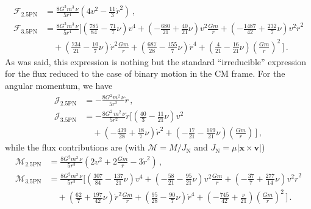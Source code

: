 \documentclass[prd,preprint,superscriptaddress,tightenlines,nofootinbib,
  eqsecnum,showpacs]{revtex4}
\begin{document}
%
\begin{subequations}\label{Fdiss}
\begin{align}
\mathcal{F}_\text{2.5PN} &= \frac{8 G^3 m^3\,\nu}{5r^4}\left( 4 v^2 -
\frac{11}{3}\dot{r}^2\right)\,,\\
\mathcal{F}_\text{3.5PN} &= \frac{8 G^3 m^3\,\nu}{5r^4}
\biggl[ \left(\frac{785}{84}-\frac{71}{7}\nu\right)v^4 
+ \left(-\frac{680}{21}+\frac{40}{21}\nu\right)v^2\frac{G m}{r} 
+ \left(-\frac{1487}{42}+\frac{232}{7}\nu\right)v^2\dot{r}^2 \nonumber\\
                         &\quad 
+ \left(\frac{734}{21}-\frac{10}{7}\nu\right)\dot{r}^2\frac{G m}{r} 
+ \left(\frac{687}{28}-\frac{155}{7}\nu\right)\dot{r}^4 
+ \left(\frac{4}{21}-\frac{16}{21}\nu\right)
\left(\frac{G m}{r}\right)^2 \,\biggr]\,.
\end{align}\end{subequations}
%
As was said, this expression is nothing but the standard ``irreducible'' expression
for the flux reduced to the case of binary motion in the CM frame. For the
angular momentum, we have
%
\begin{subequations}\label{Jdiss}
\begin{align}
\mathcal{J}_\text{2.5PN} &= - \frac{8 G^2 m^2\,\nu}{5r^2}\dot{r}\,,\\
\mathcal{J}_\text{3.5PN} &= 
- \frac{8 G^2 \,m^2\,\nu}{5r^2}\dot{r}
\biggl[ \left(\frac{40}{3}-\frac{11}{21}\nu\right)v^2 
\nonumber\\ &\quad + \left(-\frac{439}{28}
+\frac{18}{7}\nu\right) \dot{r}^2
+ \left(-\frac{17}{21}-\frac{169}{21}\nu\right) 
\left(\frac{G m}{r}\right)\,\biggr]\,,
\end{align}\end{subequations}
%
while the flux contributions are (with $\mathcal{M}=M/J_\text{N}$ and $J_\text{N}=\mu\vert\bm{x}\times\bm{v}\vert$)
%
\begin{subequations}\label{Gdiss}
\begin{align}
\mathcal{M}_\text{2.5PN} &= \frac{8 G^2 m^2\,\nu}{5r^3}\left( 2 v^2 
+ 2\frac{G m}{r} - 3\dot{r}^2\right)\,,\\
\mathcal{M}_\text{3.5PN} &= \frac{8 G^2 m^2\,\nu}{5r^3}
\biggl[ \left(\frac{307}{84}-\frac{137}{21}\nu\right)v^4 
+ \left(-\frac{58}{21}-\frac{95}{21}\nu\right)v^2\frac{G m}{r} 
+ \left(-\frac{37}{7}+\frac{277}{14}\nu\right)v^2\dot{r}^2 \nonumber\\ 
&\quad + \left(\frac{62}{7}+\frac{197}{42}\nu\right)\dot{r}^2\frac{G m}{r} 
+ \left(\frac{95}{28}-\frac{90}{7}\nu\right)\dot{r}^4 
+ \left(-\frac{745}{42}+\frac{\nu}{21}\right)
\left(\frac{G m}{r}\right)^2 \,\biggr]\,.
\end{align}\end{subequations}
%
\end{document}
